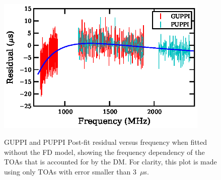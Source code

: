 \documentclass[12pt,preprint]{aastex}
\newcommand{\msR}{\mathscr{R}}
\begin{document}

\begin{figure}
\includegraphics[width=4in]{FD.ps} \\ 
\caption {\label{fig:FD} GUPPI and PUPPI Post-fit residual versus frequency when fitted
without the FD model, showing the frequency dependency of the TOAs that is 
accounted for by the DM. For
clarity, this plot is made using only TOAs with error smaller than 3~$\mu$s.} 
\end{figure} 
\end{document}
